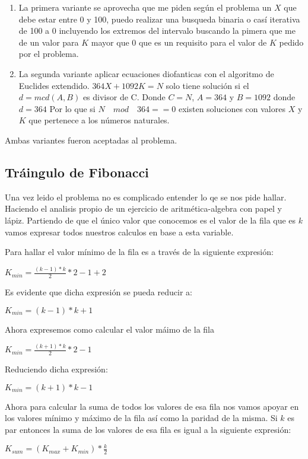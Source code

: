 \begin{enumerate}
	\item La primera variante se aprovecha que me piden según el problema un $X$ que debe estar entre 0 y 100, puedo realizar una busqueda binaria o casí iterativa de 100 a 0 incluyendo los extremos del intervalo buscando la pimera que me de un valor para $K$ mayor que 0 que es un requisito para el valor de $K$ pedido por el problema.
	
	\item La segunda variante aplicar ecuaciones diofanticas con el algoritmo de Euclides extendido. $364X + 1092K = N $ solo tiene solución si el $d=mcd(A,B)$ es divisor de C. Donde $C=N$, $A=364$ y $B=1092$ donde $d=364$ Por lo que si $N \quad mod \quad 364 == 0 $ existen soluciones con valores $X$ y $K$ que pertenece a los números naturales.  
\end{enumerate}

Ambas variantes fueron aceptadas al problema.


\subsection{Tráingulo de Fibonacci} Una vez leido el problema no es complicado entender lo qe se nos pide hallar. Haciendo el analisis propio de un ejercicio de aritmética-algebra con papel y lápiz. Partiendo de que el único valor que conocemos es el valor de la fila que es $k$ vamos expresar todos nuestros calculos en base a esta variable.

Para hallar el valor mínimo de la fila es a través de la siguiente expresión:

$K_{min}= \frac{(k-1)*k}{2} * 2 - 1 + 2 $ 

Es evidente que dicha expresión se pueda reducir a:

$K_{min}= (k-1)*k + 1 $ 

Ahora expresemos como calcular el valor máimo de la fila

$K_{min}= \frac{(k+1)*k}{2} * 2 - 1 $

Reduciendo dicha expresión:

$K_{min}= (k+1)*k - 1 $

Ahora para calcular la suma de todos los valores de esa fila nos vamos apoyar en los valores mínimo y máximo de la fila así como la paridad de la misma. Si $k$ es par entonces la suma de los valores de esa fila es igual a la siguiente expresión:

$K_{sum}= (K_{max}+K_{min}) * \frac{k}{2}  $

